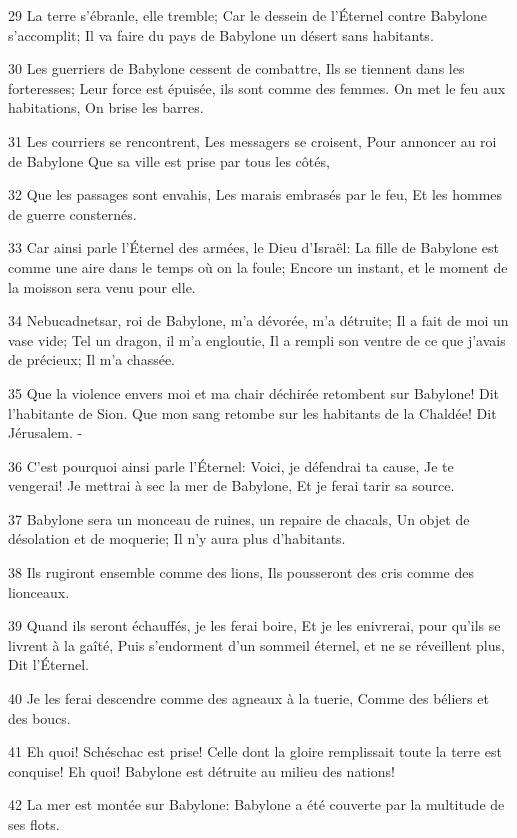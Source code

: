 \par 29 La terre s'ébranle, elle tremble; Car le dessein de l'Éternel contre Babylone s'accomplit; Il va faire du pays de Babylone un désert sans habitants.
\par 30 Les guerriers de Babylone cessent de combattre, Ils se tiennent dans les forteresses; Leur force est épuisée, ils sont comme des femmes. On met le feu aux habitations, On brise les barres.
\par 31 Les courriers se rencontrent, Les messagers se croisent, Pour annoncer au roi de Babylone Que sa ville est prise par tous les côtés,
\par 32 Que les passages sont envahis, Les marais embrasés par le feu, Et les hommes de guerre consternés.
\par 33 Car ainsi parle l'Éternel des armées, le Dieu d'Israël: La fille de Babylone est comme une aire dans le temps où on la foule; Encore un instant, et le moment de la moisson sera venu pour elle.
\par 34 Nebucadnetsar, roi de Babylone, m'a dévorée, m'a détruite; Il a fait de moi un vase vide; Tel un dragon, il m'a engloutie, Il a rempli son ventre de ce que j'avais de précieux; Il m'a chassée.
\par 35 Que la violence envers moi et ma chair déchirée retombent sur Babylone! Dit l'habitante de Sion. Que mon sang retombe sur les habitants de la Chaldée! Dit Jérusalem. -
\par 36 C'est pourquoi ainsi parle l'Éternel: Voici, je défendrai ta cause, Je te vengerai! Je mettrai à sec la mer de Babylone, Et je ferai tarir sa source.
\par 37 Babylone sera un monceau de ruines, un repaire de chacals, Un objet de désolation et de moquerie; Il n'y aura plus d'habitants.
\par 38 Ils rugiront ensemble comme des lions, Ils pousseront des cris comme des lionceaux.
\par 39 Quand ils seront échauffés, je les ferai boire, Et je les enivrerai, pour qu'ils se livrent à la gaîté, Puis s'endorment d'un sommeil éternel, et ne se réveillent plus, Dit l'Éternel.
\par 40 Je les ferai descendre comme des agneaux à la tuerie, Comme des béliers et des boucs.
\par 41 Eh quoi! Schéschac est prise! Celle dont la gloire remplissait toute la terre est conquise! Eh quoi! Babylone est détruite au milieu des nations!
\par 42 La mer est montée sur Babylone: Babylone a été couverte par la multitude de ses flots.
